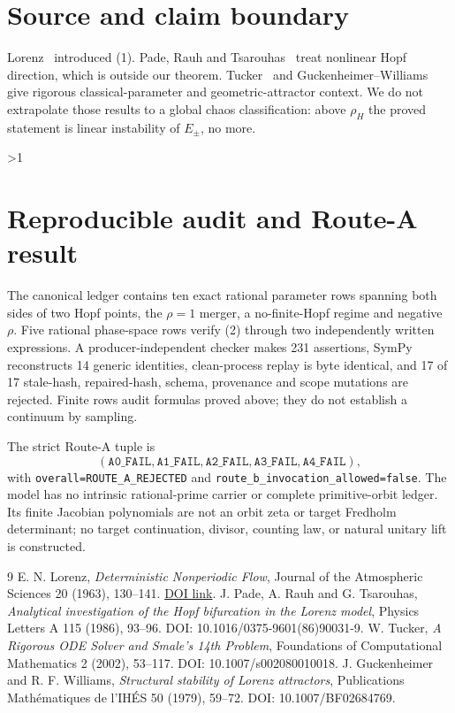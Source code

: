 \documentclass[11pt]{article}
\begin{document}
\section{Source and claim boundary}
Lorenz~\cite{lorenz1963} introduced (1).  Pade, Rauh and
Tsarouhas~\cite{pade1986} treat nonlinear Hopf direction, which is outside our
theorem.  Tucker~\cite{tucker2002} and Guckenheimer--Williams~\cite{gw1979}
give rigorous classical-parameter and geometric-attractor context.  We do not
extrapolate those results to a global chaos classification: above $\rho_H$
the proved statement is linear instability of $E_\pm$, no more.
\fi

\ifnum\CRevisionRound>1
\section{Reproducible audit and Route-A result}
The canonical ledger contains ten exact rational parameter rows spanning both
sides of two Hopf points, the $\rho=1$ merger, a no-finite-Hopf regime and
negative $\rho$.  Five rational phase-space rows verify (2) through two
independently written expressions.  A producer-independent checker makes 231
assertions, SymPy reconstructs 14 generic identities, clean-process replay is
byte identical, and 17 of 17 stale-hash, repaired-hash, schema, provenance and
scope mutations are rejected.  Finite rows audit formulas proved above; they
do not establish a continuum by sampling.

The strict Route-A tuple is
\[
 (\mathtt{A0\_FAIL},\mathtt{A1\_FAIL},\mathtt{A2\_FAIL},
  \mathtt{A3\_FAIL},\mathtt{A4\_FAIL}),
\]
with \texttt{overall=ROUTE\_A\_REJECTED} and
\texttt{route\_b\_invocation\_allowed=false}.  The model has no intrinsic
rational-prime carrier or complete primitive-orbit ledger.  Its finite
Jacobian polynomials are not an orbit zeta or target Fredholm determinant;
no target continuation, divisor, counting law, or natural unitary lift is
constructed.
\fi

\begin{thebibliography}{9}
 E. N. Lorenz, \emph{Deterministic Nonperiodic Flow},
Journal of the Atmospheric Sciences 20 (1963), 130--141.
\href{https://doi.org/10.1175/1520-0469(1963)020\%3C0130\%3ADNF\%3E2.0.CO\%3B2}{DOI link}.
 J. Pade, A. Rauh and G. Tsarouhas, \emph{Analytical
investigation of the Hopf bifurcation in the Lorenz model}, Physics Letters A
115 (1986), 93--96. DOI: 10.1016/0375-9601(86)90031-9.
 W. Tucker, \emph{A Rigorous ODE Solver and Smale's 14th
Problem}, Foundations of Computational Mathematics 2 (2002), 53--117.
DOI: 10.1007/s002080010018.
 J. Guckenheimer and R. F. Williams, \emph{Structural
stability of Lorenz attractors}, Publications Mathématiques de l'IHÉS 50
(1979), 59--72. DOI: 10.1007/BF02684769.
\end{thebibliography}
\end{document}
